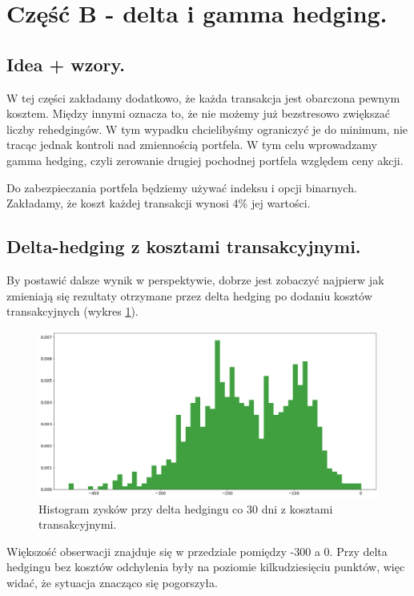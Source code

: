 \documentclass[12pt]{article}
\begin{document}
\section{Część B - delta i gamma hedging.}
\subsection{Idea + wzory.}
W tej części zakładamy dodatkowo, że każda transakcja jest obarczona pewnym kosztem. Między innymi oznacza to, że nie możemy już bezstresowo zwiększać liczby rehedgingów. W tym wypadku chcielibyśmy ograniczyć je do minimum, nie tracąc jednak kontroli nad zmiennością portfela. W tym celu wprowadzamy gamma hedging, czyli zerowanie drugiej pochodnej portfela względem ceny akcji. 

Do zabezpieczania portfela będziemy używać indeksu i opcji binarnych. Zakładamy, że koszt każdej transakcji wynosi 4\% jej wartości. 

\subsection{Delta-hedging z kosztami transakcyjnymi.}

By postawić dalsze wynik w perspektywie, dobrze jest zobaczyć najpierw jak zmieniają się rezultaty otrzymane przez delta hedging po dodaniu kosztów transakcyjnych (wykres \ref{fig:deltazkosztami}).

\begin{figure}[H]
    \centering
    \includegraphics[width=\textwidth,height=\textheight,keepaspectratio]{deltazkosztami.png}
    \caption{Histogram zysków przy delta hedgingu co 30 dni z kosztami transakcyjnymi.}
    \label{fig:deltazkosztami}
\end{figure}

Większość obserwacji znajduje się w przedziale pomiędzy -300 a 0. Przy delta hedgingu bez kosztów odchylenia były na poziomie kilkudziesięciu punktów, więc widać, że sytuacja znacząco się pogorszyła. 
\end{document}
